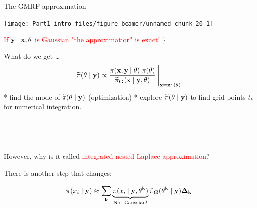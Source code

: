 \documentclass[
  ignorenonframetext,
]{beamer}
\begin{document}
\begin{frame}{The GMRF approximation}
\protect\hypertarget{the-gmrf-approximation}{}
\begin{center}\texttt{[image: Part1\_intro\_files/figure-beamer/unnamed-chunk-20-1]} \end{center}

\textcolor{red}{If $\bf{y} \mid \bf{x}, \bf{\theta}$ is Gaussian "the approximation" is exact!}
\}
\end{frame}

\begin{frame}{What do we get \ldots{}}
\protect\hypertarget{what-do-we-get}{}
\[
\widetilde{\pi}(\bf{\theta} \mid \bf{y}) \propto  \frac{
           \pi(\bf{x}, \bf{y}\mid \bf{\theta})
        \; \pi(\bf{\theta})}{\widetilde{\pi}_G(\bf{x} \mid \bf{y},
            \bf{\theta})} \: \Bigg|_{\bf{x} = \bf{x}^\star(\bf{\theta})}
\] * find the mode of \(\widetilde{\pi}(\bf{\theta}\mid \bf{y})\)
(optimization) * explore \(\widetilde{\pi}(\bf{\theta}\mid \bf{y})\) to
find grid points \(t_k\) for numerical integration.\\
\strut \\
\strut \\

\pause

However, why is it called \textcolor{red}{integrated nested Laplace
      approximation}?

\pause

There is another step that changes:

\[
\pi(x_{i} \mid \bf{y}) \approx \sum_k \underbrace{\pi(x_{i} \mid \bf{y}, \theta^k)}_{{\text{Not Gaussian!}}}{\widetilde{\pi}_G(\theta^k\mid\bf{y})} \Delta_k
\]
\end{frame}
\end{document}
